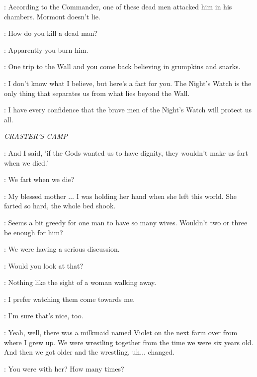 
\TYRION: According to the Commander, one of these dead men attacked him in his chambers. Mormont doesn't lie.


\VARYS: How do you kill a dead man?

\TYRION: Apparently you burn him.

\CERSEI: One trip to the Wall and you come back believing in grumpkins and snarks.

\TYRION: I don't know what I believe, but here's a fact for you. The Night's Watch is the only thing that separates us from what lies beyond the Wall.

\CERSEI: I have every confidence that the brave men of the Night's Watch will protect us all.



\scene

\textit{CRASTER'S CAMP}

\EDD: And I said, 'if the Gods wanted us to have dignity, they wouldn't make us fart when we died.'

\GRENN: We fart when we die?

\EDD: My blessed mother $\ldots$ I was holding her hand when she left this world. She farted so hard, the whole bed shook.


\SAM: Seems a bit greedy for one man to have so many wives. Wouldn't two or three be enough for him?

\EDD: We were having a serious discussion.


\GRENN: Would you look at that?

\SAM: Nothing like the sight of a woman walking away.

\GRENN: I prefer watching them come towards me.

\SAM: I'm sure that's nice, too.

\GRENN: Yeah, well, there was a milkmaid named Violet on the next farm over from where I grew up. We were wrestling together from the time we were six years old. And then we got older and the wrestling, uh$\ldots$ changed.

\SAM: You were with her? How many times?

